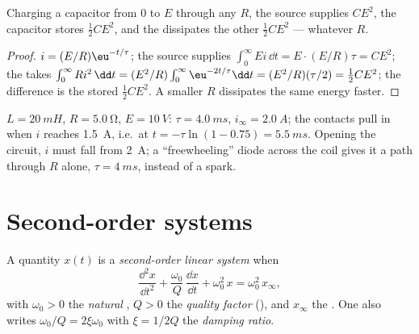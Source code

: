 \begin{proposition}\label{prop:b1:transient-regimes:rcenergy}
Charging a capacitor from $0$ to $E$ through any  $R$, the
source supplies $CE^2$, the capacitor stores $\tfrac12 CE^2$, and the
 dissipates the other $\tfrac12 CE^2$ --- whatever $R$.
\end{proposition}

\begin{proof}
$i = (E/R)\eu^{-t/\tau}$; the source supplies $\int_0^\infty Ei\,\dd t
= E \cdot (E/R)\tau = CE^2$; the  takes $\int_0^\infty Ri^2\,\dd t
= (E^2/R)\int_0^\infty \eu^{-2t/\tau}\dd t = (E^2/R)(\tau/2) = \tfrac12 CE^2$;
the difference is the stored $\tfrac12 CE^2$. A smaller $R$ dissipates
the same energy faster.
\end{proof}

\begin{example}\label{ex:b1:transient-regimes:relay}
$L = \qty{20}{mH}$, $R = \qty{5.0}{\ohm}$, $E = \qty{10}{V}$: $\tau =
\qty{4.0}{ms}$, $i_\infty = \qty{2.0}{A}$; the contacts pull in when
$i$ reaches \qty{1.5}{A}, i.e.\ at $t = -\tau\ln(1 - 0.75) =
\qty{5.5}{ms}$. Opening the circuit, $i$ must fall from \qty{2}{A}; a
``freewheeling'' diode across the coil gives it a path through $R$
alone, $\tau = \qty{4}{ms}$, instead of a spark.
\end{example}

\section{Second-order systems}

\begin{definition}\label{def:b1:transient-regimes:secondorder}
A quantity $x(t)$ is a \emph{second-order linear system} when
\[
\frac{\dd^2 x}{\dd t^2} + \frac{\omega_0}{Q}\,\frac{\dd x}{\dd t} + \omega_0^2\,x
= \omega_0^2\,x_\infty ,
\]
with $\omega_0 > 0$ the \emph{natural }, $Q > 0$ the
\emph{quality factor} (), and $x_\infty$ the .
One also writes $\omega_0/Q = 2\xi\omega_0$ with $\xi = 1/2Q$ the
\emph{damping ratio}.
\end{definition}

